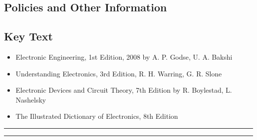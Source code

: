 \subsection*{Policies and Other Information}
\subsection*{Key Text}
\begin{itemize}
    \item Electronic Engineering, 1st Edition, 2008 by A. P. Godse, U. A. Bakshi
    \item Understanding Electronics, 3rd Edition, R. H. Warring, G. R. Slone
    \item Electronic Devices and Circuit Theory, 7th Edition by R. Boylestad, L. Nashelsky
    \item The Illustrated Dictionary of Electronics, 8th Edition
\end{itemize}
\vspace{2ex}\hrule
\vspace{2ex}\hrule\vspace{2ex}